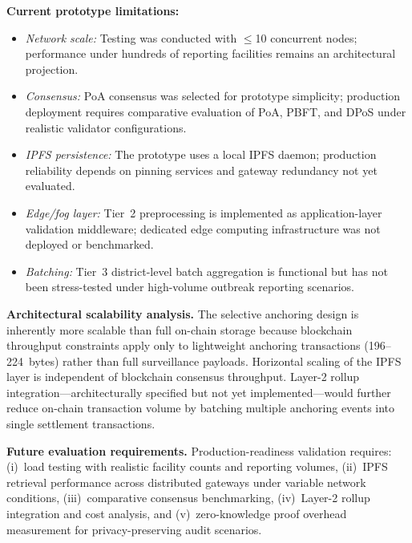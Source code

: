 \textbf{Current prototype limitations:}
\begin{itemize}
\item \emph{Network scale:} Testing was conducted with $\leq$10 concurrent nodes; performance under hundreds of reporting facilities remains an architectural projection.
\item \emph{Consensus:} PoA consensus was selected for prototype simplicity; production deployment requires comparative evaluation of PoA, PBFT, and DPoS under realistic validator configurations.
\item \emph{IPFS persistence:} The prototype uses a local IPFS daemon; production reliability depends on pinning services and gateway redundancy not yet evaluated.
\item \emph{Edge/fog layer:} Tier~2 preprocessing is implemented as application-layer validation middleware; dedicated edge computing infrastructure was not deployed or benchmarked.
\item \emph{Batching:} Tier~3 district-level batch aggregation is functional but has not been stress-tested under high-volume outbreak reporting scenarios.
\end{itemize}

\textbf{Architectural scalability analysis.} The selective anchoring design is inherently more scalable than full on-chain storage because blockchain throughput constraints apply only to lightweight anchoring transactions (196--224~bytes) rather than full surveillance payloads. Horizontal scaling of the IPFS layer is independent of blockchain consensus throughput. Layer-2 rollup integration---architecturally specified but not yet implemented---would further reduce on-chain transaction volume by batching multiple anchoring events into single settlement transactions.

\textbf{Future evaluation requirements.} Production-readiness validation requires: (i)~load testing with realistic facility counts and reporting volumes, (ii)~IPFS retrieval performance across distributed gateways under variable network conditions, (iii)~comparative consensus benchmarking, (iv)~Layer-2 rollup integration and cost analysis, and (v)~zero-knowledge proof overhead measurement for privacy-preserving audit scenarios.

